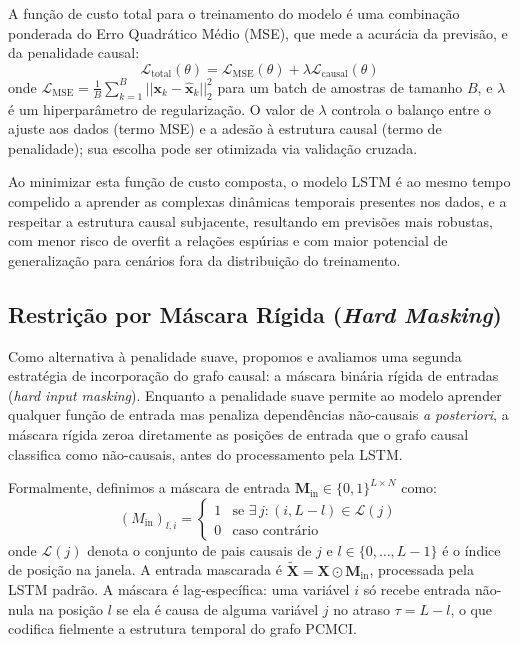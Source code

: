 \documentclass[12pt, a4paper]{article}
\begin{document}
A função de custo total para o treinamento do modelo é uma combinação ponderada do Erro Quadrático Médio (MSE), que mede a acurácia da previsão, e da penalidade causal:
$$
\mathcal{L}_{\text{total}}(\theta) = \mathcal{L}_{\text{MSE}}(\theta) + \lambda \mathcal{L}_{\text{causal}}(\theta)
$$
onde $\mathcal{L}_{\text{MSE}} = \frac{1}{B} \sum_{k=1}^{B} || \mathbf{x}_k - \hat{\mathbf{x}}_k ||^2_2$ para um batch de amostras de tamanho $B$, e $\lambda$ é um hiperparâmetro de regularização. O valor de $\lambda$ controla o balanço entre o ajuste aos dados (termo MSE) e a adesão à estrutura causal (termo de penalidade); sua escolha pode ser otimizada via validação cruzada.

Ao minimizar esta função de custo composta, o modelo LSTM é ao mesmo tempo compelido a aprender as complexas dinâmicas temporais presentes nos dados, e a respeitar a estrutura causal subjacente, resultando em previsões mais robustas, com menor risco de overfit a relações espúrias e com maior potencial de generalização para cenários fora da distribuição do treinamento.

\subsection{Restrição por Máscara Rígida (\emph{Hard Masking})}

Como alternativa à penalidade suave, propomos e avaliamos uma segunda estratégia de incorporação do grafo causal: a máscara binária rígida de entradas (\emph{hard input masking}). Enquanto a penalidade suave permite ao modelo aprender qualquer função de entrada mas penaliza dependências não-causais \emph{a posteriori}, a máscara rígida zeroa diretamente as posições de entrada que o grafo causal classifica como não-causais, antes do processamento pela LSTM.

Formalmente, definimos a máscara de entrada $\mathbf{M}_{\text{in}} \in \{0,1\}^{L \times N}$ como:
\[
(M_{\text{in}})_{l,i} = \begin{cases} 1 & \text{se } \exists\, j : (i, L - l) \in \mathcal{L}(j) \\ 0 & \text{caso contrário} \end{cases}
\]
onde $\mathcal{L}(j)$ denota o conjunto de pais causais de $j$ e $l \in \{0,\ldots,L-1\}$ é o índice de posição na janela. A entrada mascarada é $\tilde{\mathbf{X}} = \mathbf{X} \odot \mathbf{M}_{\text{in}}$, processada pela LSTM padrão. A máscara é lag-específica: uma variável $i$ só recebe entrada não-nula na posição $l$ se ela é causa de alguma variável $j$ no atraso $\tau = L - l$, o que codifica fielmente a estrutura temporal do grafo PCMCI.
\end{document}
